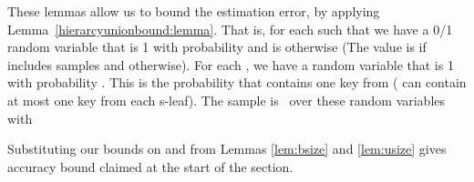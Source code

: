\documentclass[11pt]{article}
\begin{document}
\noindent
These lemmas allow us to bound the estimation error, by applying 
Lemma~\ref{hierarcyunionbound:lemma}.
That is, 
for each  such that  we have a 0/1 random
variable that is 1 with probability   and is
 otherwise 
(The value is  if  includes  
 samples and  otherwise).
 For each , we have a random variable that is 1 with
 probability .  
This is the probability that  contains one key from  ( can contain at most one key from each s-leaf). 
The sample is \varopt\ over these  random variables with

\vspace*{-1ex}
{\small
}

\noindent
Substituting our bounds on  and  from Lemmas
\ref{lem:bsize} and \ref{lem:usize} gives  accuracy bound
claimed at the start of the section. 
\end{document}
